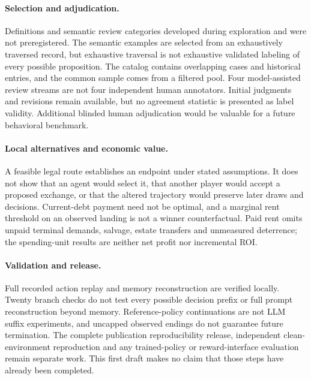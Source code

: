 \paragraph{Selection and adjudication.}
Definitions and semantic review categories developed during exploration and were not preregistered. The semantic examples are selected from an exhaustively traversed record, but exhaustive traversal is not exhaustive validated labeling of every possible proposition. The catalog contains overlapping cases and historical entries, and the common sample comes from a filtered pool. Four model-assisted review streams are not four independent human annotators. Initial judgments and revisions remain available, but no agreement statistic is presented as label validity. Additional blinded human adjudication would be valuable for a future behavioral benchmark.

\paragraph{Local alternatives and economic value.}
A feasible legal route establishes an endpoint under stated assumptions. It does not show that an agent would select it, that another player would accept a proposed exchange, or that the altered trajectory would preserve later draws and decisions. Current-debt payment need not be optimal, and a marginal rent threshold on an observed landing is not a winner counterfactual. Paid rent omits unpaid terminal demands, salvage, estate transfers and unmeasured deterrence; the spending-unit results are neither net profit nor incremental ROI.

\paragraph{Validation and release.}
Full recorded action replay and memory reconstruction are verified locally. Twenty branch checks do not test every possible decision prefix or full prompt reconstruction beyond memory. Reference-policy continuations are not LLM suffix experiments, and uncapped observed endings do not guarantee future termination. The complete publication reproducibility release, independent clean-environment reproduction and any trained-policy or reward-interface evaluation remain separate work. This first draft makes no claim that those steps have already been completed.

